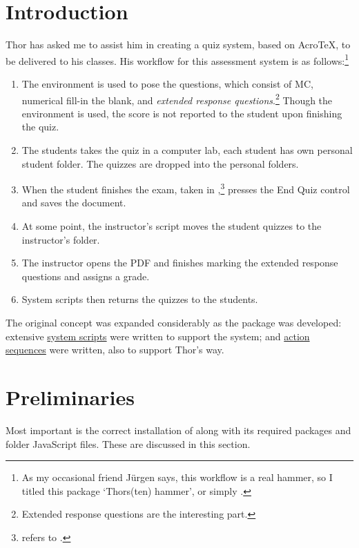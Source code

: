 \documentclass{article}
\makeatletter
\def\heshe{\@ifstar{\heshei}{\global\advance\hesheCnt1\relax\heshei}}
\def\heshei{\ifodd\hesheCnt she\else he\fi}
\def\hisher{\@ifstar{\hisheri}{\global\advance\hesheCnt1\relax\hisheri}}
\def\hisheri{\ifodd\hesheCnt her\else his\fi}
\makeatother
\begin{document}
\section{Introduction}\label{intro}

Thor has asked me to assist him in creating a quiz system, based on
Acro\negthinspace\TeX, to be delivered to his classes. His workflow for this
assessment system is as follows:\footnote{As my occasional friend J\"{u}rgen
says, this workflow is a real hammer, so I titled this package `Thors(ten)
hammer', or simply .}
\begin{enumerate}
   \item The  environment is used to pose the questions, which
      consist of MC, numerical fill-in the blank, and \emph{extended response
      questions}.\footnote{Extended response questions are the interesting
      part.} Though the  environment is used, the score is not
      reported to the student upon finishing the quiz.
   \item The students takes the quiz in a computer lab, each student has
       {\hisher} own personal student folder. The quizzes are dropped into the
       personal folders.
   \item When the student finishes the exam, taken in ,\footnote{
       refers to .} {\heshe} presses the \textsf{End
       Quiz} control and saves the document.
   \item At some point, the instructor's script moves the student quizzes
       to the instructor's folder.
   \item The instructor opens the PDF and finishes marking the extended
       response questions and assigns a grade.
   \item System scripts then returns the quizzes to the students.
\end{enumerate}
The original concept was expanded considerably as the package was developed:
extensive \hyperref[s:sysscrpts]{system scripts} were written to support the
system; and \hyperref[actSeq]{action sequences} were written, also to support
Thor's way.


\section{Preliminaries}

Most important is the correct installation of  along with
its required packages and folder JavaScript files. These are discussed in
this section.
\end{document}
